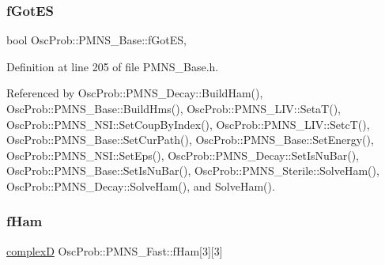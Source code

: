 \mbox{\label{classOscProb_1_1PMNS__Base_a6dc5cd010d2d70b2324745b4e53e9839}} 
\subsubsection{\texorpdfstring{f\+Got\+ES}{fGotES}}
{\footnotesize\ttfamily bool Osc\+Prob\+::\+P\+M\+N\+S\+\_\+\+Base\+::f\+Got\+ES\hspace{0.3cm}{\ttfamily [protected]}, {\ttfamily [inherited]}}



Definition at line 205 of file P\+M\+N\+S\+\_\+\+Base.\+h.



Referenced by Osc\+Prob\+::\+P\+M\+N\+S\+\_\+\+Decay\+::\+Build\+Ham(), Osc\+Prob\+::\+P\+M\+N\+S\+\_\+\+Base\+::\+Build\+Hms(), Osc\+Prob\+::\+P\+M\+N\+S\+\_\+\+L\+I\+V\+::\+Seta\+T(), Osc\+Prob\+::\+P\+M\+N\+S\+\_\+\+N\+S\+I\+::\+Set\+Coup\+By\+Index(), Osc\+Prob\+::\+P\+M\+N\+S\+\_\+\+L\+I\+V\+::\+Setc\+T(), Osc\+Prob\+::\+P\+M\+N\+S\+\_\+\+Base\+::\+Set\+Cur\+Path(), Osc\+Prob\+::\+P\+M\+N\+S\+\_\+\+Base\+::\+Set\+Energy(), Osc\+Prob\+::\+P\+M\+N\+S\+\_\+\+N\+S\+I\+::\+Set\+Eps(), Osc\+Prob\+::\+P\+M\+N\+S\+\_\+\+Decay\+::\+Set\+Is\+Nu\+Bar(), Osc\+Prob\+::\+P\+M\+N\+S\+\_\+\+Base\+::\+Set\+Is\+Nu\+Bar(), Osc\+Prob\+::\+P\+M\+N\+S\+\_\+\+Sterile\+::\+Solve\+Ham(), Osc\+Prob\+::\+P\+M\+N\+S\+\_\+\+Decay\+::\+Solve\+Ham(), and Solve\+Ham().

\mbox{\label{classOscProb_1_1PMNS__Fast_a94286a881bc53dd512a89d548346b611}} 
\subsubsection{\texorpdfstring{f\+Ham}{fHam}}
{\footnotesize\ttfamily \hyperlink{EigenPoint_8h_a67ca8e107e20610c3fff78d5e726ece0}{complexD} Osc\+Prob\+::\+P\+M\+N\+S\+\_\+\+Fast\+::f\+Ham\mbox{[}3\mbox{]}\mbox{[}3\mbox{]}\hspace{0.3cm}{\ttfamily [protected]}}



